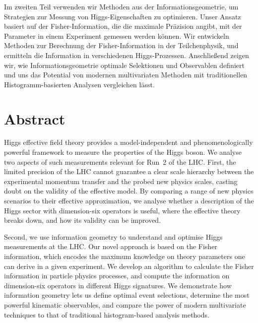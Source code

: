 Im zweiten Teil verwenden wir Methoden aus der Informationsgeometrie,
um Strategien zur Messung von Higgs-Eigenschaften zu optimieren. Unser
Ansatz basiert auf der Fisher-Information, die die maximale
Pr\"azision angibt, mit der Parameter in einem Experiment gemessen
werden k\"onnen. Wir entwickeln Methoden zur Berechnung der
Fisher-Information in der Teilchenphysik, und ermitteln die
Information in verschiedenen Higgs-Prozessen. Anschlie\ss{}end zeigen
wir, wie Informationsgeometrie optimale Selektionen und Observablen
definiert und uns das Potential von modernen multivariaten Methoden
mit traditionellen Histogramm-basierten Analysen vergleichen l\"asst.



\chapter*{Abstract}


Higgs effective field theory provides a model-independent and
phenomenologically powerful framework to measure the properties of the
Higgs boson. We analyse two aspects of such measurements relevant for
Run~2 of the LHC. First, the limited precision of the LHC cannot
guarantee a clear scale hierarchy between the experimental momentum
transfer and the probed new physics scales, casting doubt on the
validity of the effective model. By comparing a range of new physics
scenarios to their effective approximation, we analyse whether a
description of the Higgs sector with dimension-six operators is
useful, where the effective theory breaks down, and how its validity
can be improved.

Second, we use information geometry to understand and optimise Higgs
measurements at the LHC. Our novel approach is based on the Fisher
information, which encodes the maximum knowledge on theory parameters
one can derive in a given experiment. We develop an algorithm to
calculate the Fisher information in particle physics processes, and
compute the information on dimension-six operators in different Higgs
signatures.  We demonstrate how information geometry lets us define
optimal event selections, determine the most powerful kinematic
observables, and compare the power of modern multivariate techniques
to that of traditional histogram-based analysis methods.
